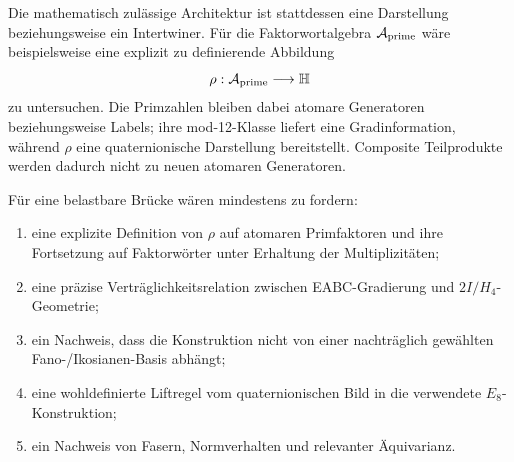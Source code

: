 \documentclass[11pt,a4paper]{article}
\begin{document}
Die mathematisch zulässige Architektur ist stattdessen eine Darstellung beziehungsweise ein Intertwiner. Für die Faktorwortalgebra $\mathcal A_{\rm prime}$ wäre beispielsweise eine explizit zu definierende Abbildung
\[
\rho:\mathcal A_{\rm prime}\longrightarrow\mathbb H
\]
zu untersuchen. Die Primzahlen bleiben dabei atomare Generatoren beziehungsweise Labels; ihre mod-12-Klasse liefert eine Gradinformation, während $\rho$ eine quaternionische Darstellung bereitstellt. Composite Teilprodukte werden dadurch nicht zu neuen atomaren Generatoren.

Für eine belastbare Brücke wären mindestens zu fordern:
\begin{enumerate}[leftmargin=1.6em]
\item eine explizite Definition von $\rho$ auf atomaren Primfaktoren und ihre Fortsetzung auf Faktorwörter unter Erhaltung der Multiplizitäten;
\item eine präzise Verträglichkeitsrelation zwischen EABC-Gradierung und $2I/H_4$-Geometrie;
\item ein Nachweis, dass die Konstruktion nicht von einer nachträglich gewählten Fano-/Ikosianen-Basis abhängt;
\item eine wohldefinierte Liftregel vom quaternionischen Bild in die verwendete $E_8$-Konstruktion;
\item ein Nachweis von Fasern, Normverhalten und relevanter Äquivarianz.
\end{enumerate}
\end{document}
